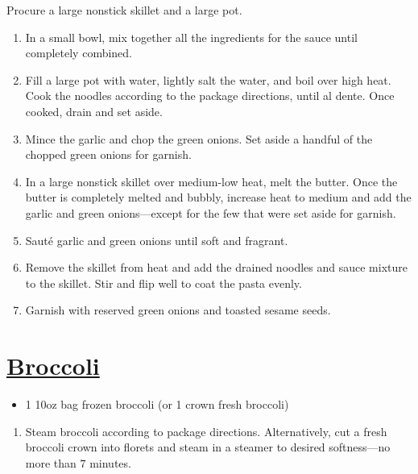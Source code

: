 \begin{minipage}{\textwidth}
\begin{vwcol}[widths={0.6,0.4}, rule=0pt]
\begin{minipage}{0.55\textwidth}
\instructions
Procure a large nonstick skillet and a large pot.
\begin{enumerate}
    \item In a small bowl, mix together all the ingredients for the sauce until completely combined.
    \item Fill a large pot with water, lightly salt the water, and boil over high heat. Cook the noodles according to the package directions, until al dente. Once cooked, drain and set aside.
    \item Mince the garlic and chop the green onions. Set aside a handful of the chopped green onions for garnish.
    \item In a large nonstick skillet over medium-low heat, melt the butter. Once the butter is completely melted and bubbly, increase heat to medium and add the garlic and green onions---except for the few that were set aside for garnish.
    \item Sauté garlic and green onions until soft and fragrant.
    \item Remove the skillet from heat and add the drained noodles and sauce mixture to the skillet. Stir and flip well to coat the pasta evenly.
    \item Garnish with reserved green onions and toasted sesame seeds.
\end{enumerate}
\end{minipage}

\newpage
\begin{minipage}{0.3\linewidth}
\section*{\underline{Broccoli}}
\ingredients
\vspace{-1em}
\begin{itemize}
    \item 1 10oz bag frozen broccoli (or 1 crown fresh broccoli)
\end{itemize}
\vspace{1em}

\instructions
\vspace{-1em}
\begin{enumerate}
    \item Steam broccoli according to package directions. Alternatively, cut a fresh broccoli crown into florets and steam in a steamer to desired softness---no more than $7$ minutes.
\end{enumerate}


\end{minipage}
\end{vwcol}
\end{minipage}
